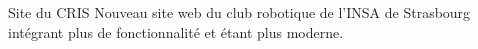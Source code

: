 Site du C\+R\+I\+S Nouveau site web du club robotique de l'I\+N\+S\+A de Strasbourg intégrant plus de fonctionnalité et étant plus moderne. 